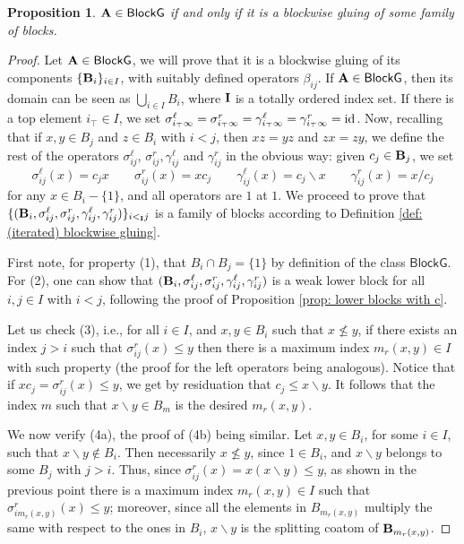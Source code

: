 \documentclass{amsart}
\newtheorem{proposition}[theorem]{Proposition}
\theoremstyle{definition}
\numberwithin{equation}{section}
\newcommand{\alg}[1]{{\textbf{\upshape #1}}}  %
\newcommand{\vv}[1]{\mathsf {#1}}
\newcommand{\sell}{\sigma^\ell}
\newcommand{\sr}{\sigma^r}
\newcommand{\gell}{\gamma^\ell}
\newcommand{\gr}{\gamma^r}
\newcommand{\Sell}[2]{\sigma^\ell_{#1#2}}
\newcommand{\Sellx}[3]{\sigma^\ell_{#1#2}(#3)}
\newcommand{\Gell}[2]{\gamma^\ell_{#1#2}}
\newcommand{\Gellx}[3]{\gamma^\ell_{#1#2}(#3)}
\newcommand{\Sr}[2]{\sigma^r_{#1#2}}
\newcommand{\Srx}[3]{\sigma^r_{#1#2}(#3)}
\newcommand{\Gr}[2]{\gamma^r_{#1#2}}
\newcommand{\Grx}[3]{\gamma^r_{#1#2}(#3)}
\newcommand{\betaij}{\beta_{ij}}
\newcommand{\BlG}{\vv{BlockG}}
\begin{document}
\begin{proposition}\label{proposition: a in BG}
$\alg A \in \BlG$ if and only if it is a blockwise gluing of some family of blocks. 
\end{proposition}
\begin{proof}
	Let $\alg A \in \BlG$, we will prove that it is a blockwise gluing of its components $\{\alg B_i \}_{i \in I}$, with suitably defined operators $\betaij$. If $\alg A \in \BlG$, then its domain can be seen as $\bigcup_{i \in { I}} B_i$, where ${\bf I}$ is a totally ordered index set. If there is a top element $i_\top \in I$, we set $\sell_{i_\top \infty} = \sr_{i_\top \infty} = \gell_{i_\top \infty} = \gr_{i_\top \infty} = {\rm id}$. Now, recalling that if $x, y \in B_j$ and $z \in B_i$ with $i < j$, then $xz=yz$ and $zx=zy$, we define the rest of the operators $\Sell i j$, $\Sr i j , \Gell i j$ and $\Gr i j$ in the obvious way: given $c_j \in \alg B_j$, we set
	$$
	\Sellx i j x=c_jx \qquad \Srx i j x=xc_j \qquad \Gellx i j x=c_j \backslash x \qquad \Grx i j x=x/c_j
	$$
	for any $x \in B_i- \{1\}$, and all operators are $1$ at $1$. 
	We proceed to prove that $\{(\alg B_i, \Sell i j, \Sr i j, \Gell i j, \Gr i j)\}_{i <_{\alg I} j}$ is a family of blocks according to Definition \ref{def: (iterated) blockwise gluing}. 
	
	First note, for property (1), that $B_i \cap B_j= \{1\}$ by definition of the class $\BlG$. For (2), one can show that $(\alg B_i, \Sell i j, \Sr i j, \Gell i j, \Gr i j)$ is a weak lower block for all $i, j \in I$ with $i < j$, following the proof of Proposition \ref{prop: lower blocks with c}. 
	
	Let us check (3), i.e., for all $i \in I$, and $x,y \in B_i$ such that $x \not\leq y$, if there exists an index $j > i$ such that $\Srx i j x \leq y$ then there is a maximum index  $m_r(x,y) \in I$ with such property (the proof for the left operators being analogous). Notice that if $x c_j = \Srx i j x \leq y$, we get by residuation that $c_j \leq x \backslash y$. It follows that the index $m$ such that $x \backslash y \in B_m$ is the desired $m_r(x,y)$. 
	
	We now verify (4a), the proof of (4b) being similar. Let $x, y \in B_i$, for some $i \in I$, such that $x \backslash y \not \in B_i$. Then necessarily $x \not\leq y$, since $1 \in B_i$, and $x \backslash y$ belongs to some $B_j$ with $j > i$. Thus, since 
	$\Srx i j x =x (x\backslash y) \leq y$, as shown in the previous point there is a maximum index $m_r(x,y) \in I$ such that $\Srx i {m_r(x,y)} x \leq y$; moreover, since all the elements in $B_{m_r(x,y)}$ multiply the same with respect to the ones in $B_i$, $x \backslash y$ is the splitting coatom of $\alg B_{m_r(x,y)}$.
		

\end{proof}
\end{document}
